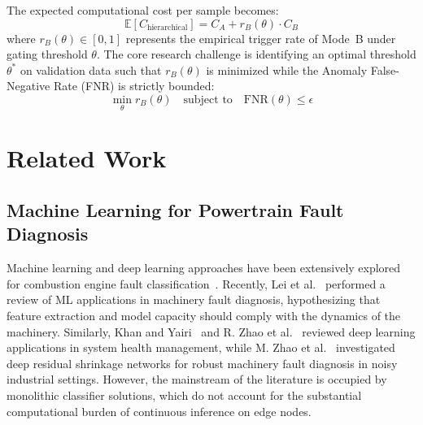 \documentclass[journal]{IEEEtran}
\begin{document}
The expected computational cost per sample becomes:
\begin{equation}
    \mathbb{E}[C_{\text{hierarchical}}] = C_A + r_B(\theta) \cdot C_B
    \label{eq:cost_model}
\end{equation}
where $r_B(\theta) \in [0, 1]$ represents the empirical trigger rate of Mode~B under gating threshold $\theta$. The core research challenge is identifying an optimal threshold $\theta^*$ on validation data such that $r_B(\theta)$ is minimized while the Anomaly False-Negative Rate (FNR) is strictly bounded:
\begin{equation}
    \min_{\theta} r_B(\theta) \quad \text{subject to} \quad \text{FNR}(\theta) \le \epsilon
\end{equation}

\section{Related Work}
\subsection{Machine Learning for Powertrain Fault Diagnosis}
Machine learning and deep learning approaches have been extensively explored for combustion engine fault classification~\cite{aliramezani2022modeling,ahmed2015automotive,liu2018artificial}. Recently, Lei et al.~\cite{lei2020applications} performed a review of ML applications in machinery fault diagnosis, hypothesizing that feature extraction and model capacity should comply with the dynamics of the machinery. Similarly, Khan and Yairi~\cite{khan2018review} and R. Zhao et al.~\cite{zhao2019deep} reviewed deep learning applications in system health management, while M. Zhao et al.~\cite{zhao2020deep} investigated deep residual shrinkage networks for robust machinery fault diagnosis in noisy industrial settings. However, the mainstream of the literature is occupied by monolithic classifier solutions, which do not account for the substantial computational burden of continuous inference on edge nodes.
\end{document}
